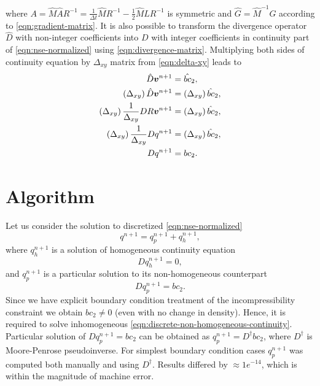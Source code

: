 \documentclass{article}
\numberwithin{equation}{section}
\begin{document}
where $A=\hat{M}\hat{A}R^{-1}=\frac{1}{\Delta t}\hat{M}R^{-1}-\frac{1}{2}\hat{M}\hat{L}R^{-1}$ is symmetric and $\hat{G}=\hat{M}^{-1}G$ according to \cref{eqn:gradient-matrix}. It is also possible to transform the divergence operator $\hat{D}$ with non-integer coefficients into $D$ with integer coefficients in continuity part of \cref{eqn:nse-normalized} using  \cref{eqn:divergence-matrix}. Multiplying both sides of continuity equation by $\Delta _{xy}$ matrix from \cref{eqn:delta-xy} leads to 
\begin{align*}
	\hat{D}\boldsymbol{v}^{n+1}&= \hat{bc}_2,\notag\\
	\left(\Delta_{xy} \right)\hat{D}\boldsymbol{v}^{n+1}&=\left ( \Delta_{xy}\right ) \hat{bc}_2,\notag\\
	\left(\Delta_{xy}\right)\frac{1}{\Delta _{xy}}{D}R\boldsymbol{v}^{n+1}&=\left ( \Delta_{xy}\right ) \hat{bc}_2,\notag\\
	\left(\Delta_{xy}\right)\frac{1}{\Delta_{xy}}{D}q^{n+1}&=\left ( \Delta_{xy}\right ) \hat{bc}_2,\notag\\
	D{q}^{n+1}&=bc_2.
\end{align*}



\section{Algorithm}\label{sec:algorithm}
Let us consider the solution to discretized \cref{eqn:nse-normalized}
\begin{equation*}
	q^{n+1}=q^{n+1}_p+q^{n+1}_h,
\end{equation*}
where $q^{n+1}_h$ is a solution of homogeneous continuity equation 
\begin{equation}\label{eqn:discrete-homogeneous-continuity}
	Dq^{n+1}_h=0,
\end{equation}
and $q^{n+1}_p$ is a particular solution to its non-homogeneous counterpart
\begin{equation}\label{eqn:discrete-non-homogeneous-continuity}
	Dq^{n+1}_p=bc_2.
\end{equation}
Since we have explicit boundary condition treatment of the incompressibility constraint we obtain $bc_2\neq0$ (even with no change in density). Hence, it is required to solve inhomogeneous \cref{eqn:discrete-non-homogeneous-continuity}. Particular solution of $Dq^{n+1}_p=bc_2$ can be obtained as $q^{n+1}_p=D^{\dagger}bc_2$, where    $D^{\dagger}$
 is  Moore-Penrose pseudoinverse. For simplest boundary condition cases $q^{n+1}_p$ was computed both manually and using $D^{\dagger}$. Results differed by $\approx 1e^{-14}$, which is within the magnitude of machine error. 
\end{document}
